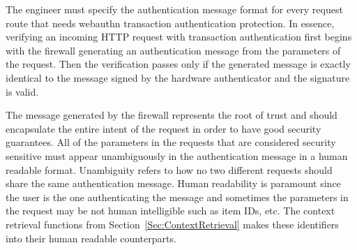 The engineer must specify the authentication message format for every request route that needs webauthn transaction authentication protection. In essence, verifying an incoming HTTP request with transaction authentication first begins with the firewall generating an authentication message from the parameters of the request. Then the verification passes only if the generated message is exactly identical to the message signed by the hardware authenticator and the signature is valid.

The message generated by the firewall represents the root of trust and should encapsulate the entire intent of the request in order to have good security guarantees. All of the parameters in the requests that are considered security sensitive must appear unambiguously in the authentication message in a human readable format. Unambiguity refers to how no two different requests should share the same authentication message. Human readability is paramount since the user is the one authenticating the message and sometimes the parameters in the request may be not human intelligible such as item IDs, etc. The context retrieval functions from Section~\ref{Sec:ContextRetrieval} makes these identifiers into their human readable counterparts.

\iffalse
The requests that need to be webauthn verified, the engineer must specify their authentication message format. 

is reconfigured to issue backend requests to the IP address

Upon opening the web page, requests are issued from the web-browser

has two options to specify how a route gets verified.

This message should encapsulate 

also included in the request and the associated signature is valid.
\fi
